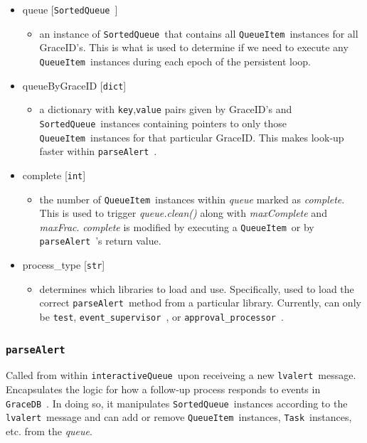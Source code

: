 \documentclass{article}
\newcommand{\GraceDB}{\texttt{GraceDB}~}
\newcommand{\alert}{\texttt{lvalert}~}
\newcommand{\interactiveQueue}{\texttt{interactiveQueue}~}
\newcommand{\parseAlert}{\texttt{parseAlert}~}
\newcommand{\SortedQueue}{\texttt{SortedQueue}~}
\newcommand{\QueueItem}{\texttt{QueueItem}~}
\newcommand{\Task}{\texttt{Task}~}
\newcommand{\approvalProcessor}{\texttt{approval\_processor}~}
\newcommand{\eventSupervisor}{\texttt{event\_supervisor}~}
\begin{document}
\begin{itemize}
    \item{queue [\SortedQueue]
        \begin{itemize}
            \item{an instance of \SortedQueue that contains all \QueueItem instances for all GraceID's. This is what is used to determine if we need to execute any \QueueItem instances during each epoch of the persistent loop.}
        \end{itemize}
         }
    \item{queueByGraceID [\texttt{dict}]
        \begin{itemize}
            \item{a dictionary with \texttt{key},\texttt{value} pairs given by GraceID's and \SortedQueue instances containing pointers to only those \QueueItem instances for that particular GraceID. This makes look-up faster within \parseAlert.}
        \end{itemize}
         }
    \item{complete [\texttt{int}]
        \begin{itemize}
            \item{the number of \QueueItem instances within \textit{queue} marked as \textit{complete}. This is used to trigger \textit{queue.clean()} along with \textit{maxComplete} and \textit{maxFrac}. \textit{complete} is modified by executing a \QueueItem or by \parseAlert's return value.}
        \end{itemize}
         }
    \item{process\_type [\texttt{str}]
        \begin{itemize}
            \item{determines which libraries to load and use. Specifically, used to load the correct \parseAlert method from a particular library. Currently, can only be \texttt{test}, \eventSupervisor, or \approvalProcessor.}
        \end{itemize}
         }
\end{itemize}


\subsubsection{\parseAlert}
\label{sec: parseAlert}

Called from within \interactiveQueue upon receiveing a new \alert message.
Encapsulates the logic for how a follow-up process responds to events in \GraceDB.
In doing so, it manipulates \SortedQueue instances according to the \alert message and can add or remove \QueueItem instances, \Task instances, etc. from the \textit{queue}.
\end{document}
